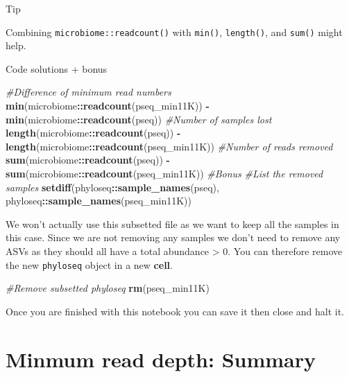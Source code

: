 \documentclass[
]{book}
\newenvironment{Shaded}{\begin{snugshade}}{\end{snugshade}}
\newcommand{\CommentTok}[1]{\textcolor[rgb]{0.56,0.35,0.01}{\textit{#1}}}
\newcommand{\FunctionTok}[1]{\textcolor[rgb]{0.13,0.29,0.53}{\textbf{#1}}}
\newcommand{\NormalTok}[1]{#1}
\newcommand{\SpecialCharTok}[1]{\textcolor[rgb]{0.81,0.36,0.00}{\textbf{#1}}}
\begin{document}
Tip

Combining \texttt{microbiome::readcount()} with \texttt{min()}, \texttt{length()}, and \texttt{sum()} might help.

Code solutions + bonus

\begin{Shaded}
\begin{Highlighting}[]
\CommentTok{\#Difference of minimum read numbers}
\FunctionTok{min}\NormalTok{(microbiome}\SpecialCharTok{::}\FunctionTok{readcount}\NormalTok{(pseq\_min11K)) }\SpecialCharTok{{-}} \FunctionTok{min}\NormalTok{(microbiome}\SpecialCharTok{::}\FunctionTok{readcount}\NormalTok{(pseq))}
\CommentTok{\#Number of samples lost}
\FunctionTok{length}\NormalTok{(microbiome}\SpecialCharTok{::}\FunctionTok{readcount}\NormalTok{(pseq)) }\SpecialCharTok{{-}} \FunctionTok{length}\NormalTok{(microbiome}\SpecialCharTok{::}\FunctionTok{readcount}\NormalTok{(pseq\_min11K))}
\CommentTok{\#Number of reads removed}
\FunctionTok{sum}\NormalTok{(microbiome}\SpecialCharTok{::}\FunctionTok{readcount}\NormalTok{(pseq)) }\SpecialCharTok{{-}} \FunctionTok{sum}\NormalTok{(microbiome}\SpecialCharTok{::}\FunctionTok{readcount}\NormalTok{(pseq\_min11K))}
\CommentTok{\#Bonus}
\CommentTok{\#List the removed samples}
\FunctionTok{setdiff}\NormalTok{(phyloseq}\SpecialCharTok{::}\FunctionTok{sample\_names}\NormalTok{(pseq), phyloseq}\SpecialCharTok{::}\FunctionTok{sample\_names}\NormalTok{(pseq\_min11K))}
\end{Highlighting}
\end{Shaded}

We won't actually use this subsetted file as we want to keep all the samples in this case.
Since we are not removing any samples we don't need to remove any ASVs as they should all have a total abundance \textgreater{} 0.
You can therefore remove the new \texttt{phyloseq} object in a new \textbf{cell}.

\begin{Shaded}
\begin{Highlighting}[]
\CommentTok{\#Remove subsetted phyloseq}
\FunctionTok{rm}\NormalTok{(pseq\_min11K)}
\end{Highlighting}
\end{Shaded}

Once you are finished with this notebook you can save it then close and halt it.

\hypertarget{minmum-read-depth-summary}{%
\section{Minmum read depth: Summary}\label{minmum-read-depth-summary}}
\end{document}
